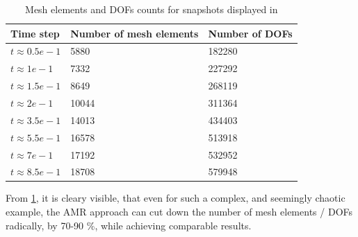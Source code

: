 \begin{table}
    \begin{tabular}
		{ | l | l | p{5cm} |}
		\hline
    \textbf{Time step} & \textbf{Number of mesh elements} & \textbf{Number of DOFs} \\
		\hline
    $t\approx 0.5e-1$ & 5880 & 182280  \\ \hline
    $t\approx 1e-1$ & 7332 & 227292  \\ \hline
    $t\approx 1.5e-1$ & 8649 & 268119  \\ \hline
    $t\approx 2e-1$ & 10044 & 311364  \\ \hline
    $t\approx 3.5e-1$ & 14013 & 434403  \\ \hline
    $t\approx 5.5e-1$ & 16578  & 513918 \\ \hline
    $t\approx 7e-1$ & 17192 & 532952  \\ \hline
    $t\approx 8.5e-1$ & 18708 & 579948  \\ \hline
    \end{tabular}
	\caption{Mesh elements and DOFs counts for snapshots displayed in }
\label{table:meshElems}
\end{table}

From \cref{table:meshElems}, it is cleary visible, that even for such a complex, and seemingly chaotic example, the AMR approach can cut down the number of mesh elements / DOFs radically, by 70-90 \%, while achieving comparable results. 

